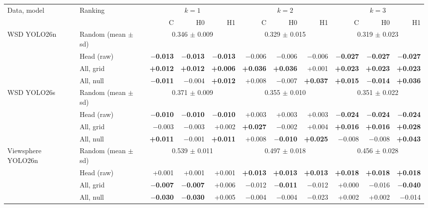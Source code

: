\begin{tabular}{llrrrrrrrrr}
\toprule
Data, model & Ranking & \multicolumn{3}{c}{$k=1$} & \multicolumn{3}{c}{$k=2$} & \multicolumn{3}{c}{$k=3$} \\
\cmidrule(lr){3-5}\cmidrule(lr){6-8}\cmidrule(lr){9-11}
 & & C & H0 & H1 & C & H0 & H1 & C & H0 & H1 \\
\midrule
WSD YOLO26n & Random (mean $\pm$ sd) & \multicolumn{3}{c}{0.346 $\pm$ 0.009} & \multicolumn{3}{c}{0.329 $\pm$ 0.015} & \multicolumn{3}{c}{0.319 $\pm$ 0.023} \\
 & Head (raw) & \textbf{$-$0.013} & \textbf{$-$0.013} & \textbf{$-$0.013} & $-$0.006 & $-$0.006 & $-$0.006 & \textbf{$-$0.027} & \textbf{$-$0.027} & \textbf{$-$0.027} \\
 & All, grid & \textbf{+0.012} & \textbf{+0.012} & \textbf{+0.006} & \textbf{+0.036} & \textbf{+0.036} & +0.001 & \textbf{+0.023} & \textbf{+0.023} & \textbf{+0.023} \\
 & All, null & \textbf{$-$0.011} & $-$0.004 & \textbf{+0.012} & +0.008 & $-$0.007 & \textbf{+0.037} & \textbf{+0.015} & \textbf{$-$0.014} & \textbf{+0.036} \\
\midrule
WSD YOLO26s & Random (mean $\pm$ sd) & \multicolumn{3}{c}{0.371 $\pm$ 0.009} & \multicolumn{3}{c}{0.355 $\pm$ 0.010} & \multicolumn{3}{c}{0.351 $\pm$ 0.022} \\
 & Head (raw) & \textbf{$-$0.010} & \textbf{$-$0.010} & \textbf{$-$0.010} & +0.003 & +0.003 & +0.003 & \textbf{$-$0.024} & \textbf{$-$0.024} & \textbf{$-$0.024} \\
 & All, grid & $-$0.003 & $-$0.003 & +0.002 & \textbf{+0.027} & $-$0.002 & +0.004 & \textbf{+0.016} & \textbf{+0.016} & \textbf{+0.028} \\
 & All, null & \textbf{+0.011} & $-$0.001 & \textbf{+0.011} & +0.008 & \textbf{$-$0.010} & \textbf{+0.025} & $-$0.008 & $-$0.008 & \textbf{+0.043} \\
\midrule
Viewsphere YOLO26n & Random (mean $\pm$ sd) & \multicolumn{3}{c}{0.539 $\pm$ 0.011} & \multicolumn{3}{c}{0.497 $\pm$ 0.018} & \multicolumn{3}{c}{0.456 $\pm$ 0.028} \\
 & Head (raw) & +0.001 & +0.001 & +0.001 & \textbf{+0.013} & \textbf{+0.013} & \textbf{+0.013} & \textbf{+0.018} & \textbf{+0.018} & \textbf{+0.018} \\
 & All, grid & \textbf{$-$0.007} & \textbf{$-$0.007} & +0.006 & $-$0.012 & \textbf{$-$0.011} & $-$0.012 & +0.000 & $-$0.016 & \textbf{$-$0.040} \\
 & All, null & \textbf{$-$0.030} & \textbf{$-$0.030} & +0.005 & $-$0.004 & $-$0.004 & $-$0.023 & +0.002 & +0.002 & $-$0.014 \\

\end{tabular}
